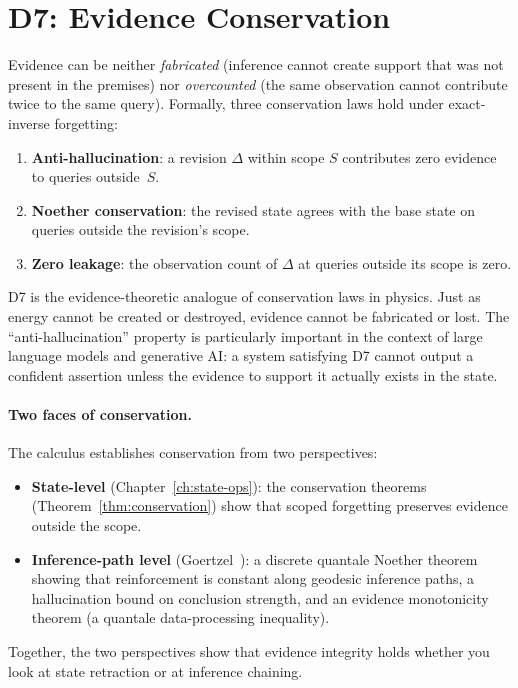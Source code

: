 \documentclass[11pt,openany]{report}
\begin{document}
\section{D7: Evidence Conservation}
\label{sec:d7}

\begin{definition}
\label{def:d7}
Evidence can be neither \emph{fabricated} (inference cannot create
support that was not present in the premises) nor \emph{overcounted}
(the same observation cannot contribute twice to the same query).
Formally, three conservation laws hold under exact-inverse forgetting:
\begin{enumerate}
\item \textbf{Anti-hallucination}: a revision $\Delta$ within scope
  $S$ contributes zero evidence to queries outside~$S$.
\item \textbf{Noether conservation}: the revised state agrees with the
  base state on queries outside the revision's scope.
\item \textbf{Zero leakage}: the observation count of $\Delta$ at
  queries outside its scope is zero.
\end{enumerate}
\end{definition}

\noindent
D7 is the evidence-theoretic analogue of conservation laws in physics.
Just as energy cannot be created or destroyed, evidence cannot be
fabricated or lost.  The ``anti-hallucination'' property is
particularly important in the context of large language models and
generative AI: a system satisfying D7 cannot output a confident
assertion unless the evidence to support it actually exists in the
state.

\paragraph{Two faces of conservation.}
The calculus establishes conservation from two perspectives:
\begin{itemize}
\item \textbf{State-level} (Chapter~\ref{ch:state-ops}): the
  conservation theorems (Theorem~\ref{thm:conservation}) show that
  scoped forgetting preserves evidence outside the scope.
\item \textbf{Inference-path level}
  (Goertzel~\cite{GoertzelEvidenceConservation2026}): a discrete
  quantale Noether theorem showing that reinforcement is constant
  along geodesic inference paths, a hallucination bound on conclusion
  strength, and an evidence monotonicity theorem (a quantale
  data-processing inequality).
\end{itemize}
Together, the two perspectives show that evidence integrity holds
whether you look at state retraction or at inference chaining.
\end{document}
